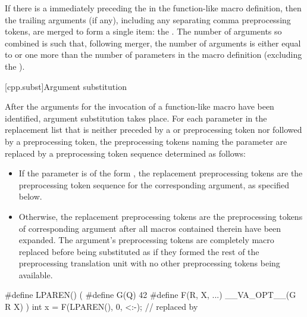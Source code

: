 \pnum
{}%
If there is a  immediately preceding the \tcode{)} in the
function-like macro
definition, then the trailing arguments (if any), including any separating comma preprocessing
tokens, are merged to form a single item: the . The number of
arguments so combined is such that, following merger, the number of arguments is
either equal to or
one more than the number of parameters in the macro definition (excluding the
).

[cpp.subst]{Argument substitution}%
%
%

%
\begin{bnf}
\br
      \terminal{)}
\end{bnf}

\pnum
After the arguments for the invocation of a function-like macro have
been identified, argument substitution takes place.
For each parameter in the replacement list that is neither
preceded by a \tcode{\#} or \tcode{\#\#} preprocessing token nor
followed by a \tcode{\#\#} preprocessing token, the preprocessing tokens
naming the parameter are replaced by a preprocessing token sequence determined as follows:
\begin{itemize}
\item
  If the parameter is of the form ,
  the replacement preprocessing tokens are the
  preprocessing token sequence for the corresponding argument,
  as specified below.
\item
  Otherwise, the replacement preprocessing tokens are the
  preprocessing tokens of corresponding argument after all
  macros contained therein have been expanded. The argument's
  preprocessing tokens are completely macro replaced before
  being substituted as if they formed the rest of the preprocessing
  translation unit with no other preprocessing tokens being available.
\end{itemize}
\begin{example}
\begin{codeblock}
#define LPAREN() (
#define G(Q) 42
#define F(R, X, ...)  __VA_OPT__(G R X) )
int x = F(LPAREN(), 0, <:-);    // replaced by 
\end{codeblock}
\end{example}

